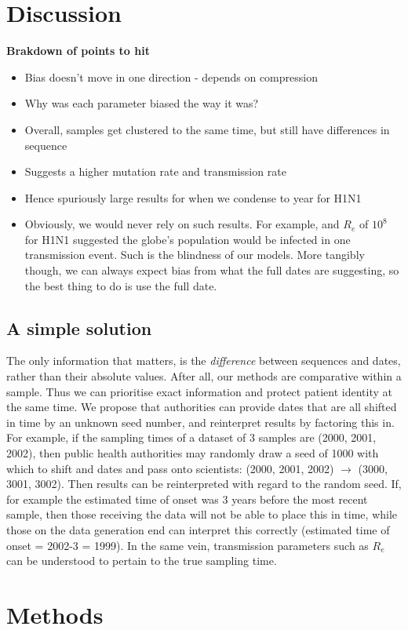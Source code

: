 \documentclass{article}
\begin{document}
\begin{spacing}{1.5}
\section*{Discussion}
\textbf{Brakdown of points to hit}
\begin{itemize}
    \item Bias doesn't move in one direction - depends on compression
    \item Why was each parameter biased the way it was?
    \item Overall, samples get clustered to the same time, but still have differences in sequence
    \item Suggests a higher mutation rate and transmission rate
    \item Hence spuriously large results for when we condense to year for H1N1
    \item Obviously, we would never rely on such results. For example, and $R_e$ of $10^8$ for H1N1 suggested the globe's population would be infected in one transmission event. Such is the blindness of our models. More tangibly though, we can always expect bias from what the full dates are suggesting, so the best thing to do is use the full date.
\end{itemize}
\subsection*{A simple solution}
The only information that matters, is the \emph{difference} between sequences and dates, rather than their absolute values. After all, our methods are comparative within a sample. Thus we can prioritise exact information and protect patient identity at the same time. We propose that authorities can provide dates that are all shifted in time by an unknown seed number, and reinterpret results by factoring this in. For example, if the sampling times of a dataset of 3 samples are (2000, 2001, 2002), then public health authorities may randomly draw a seed of 1000 with which to shift and dates and pass onto scientists: (2000, 2001, 2002) $\rightarrow$ (3000, 3001, 3002). Then results can be reinterpreted with regard to the random seed. If, for example the estimated time of onset was 3 years before the most recent sample, then those receiving the data will not be able to place this in time, while those on the data generation end can interpret this correctly (estimated time of onset = 2002-3 = 1999). In the same vein, transmission parameters such as $R_e$ can be understood to pertain to the true sampling time.


\section*{Methods}

\end{spacing}



\end{document}
